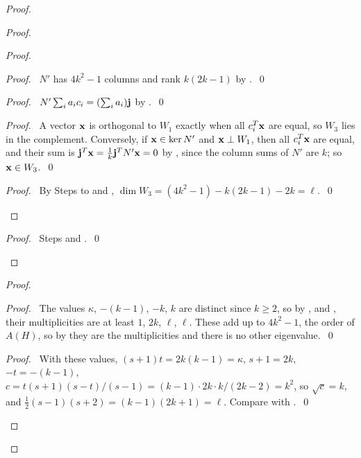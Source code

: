 \begin{proof}
\begin{proof}
  \begin{proof}
   \begin{proof}\pf\ $N'$ has $4k^2-1$ columns and rank $k(2k-1)$ by
    .~\qed\end{proof}
   \begin{proof}\pf\ $N'\sum_ia_ic_i=(\sum_ia_i){\mathbf j}$ by .~\qed\end{proof}
   \begin{proof}\pf\ A vector ${\mathbf x}$ is orthogonal to $W_1$ exactly when all $c_i^T{\mathbf x}$ are
    equal, so $W_3$ lies in the complement. Conversely, if ${\mathbf x}\in\ker N'$ and ${\mathbf x}\perp W_1$,
    then all $c_i^T{\mathbf x}$ are equal, and their sum is ${\mathbf j}^T{\mathbf x}=\frac1k{\mathbf j}^TN'{\mathbf x}=0$ by
    , since the column sums of $N'$ are $k$; so ${\mathbf x}\in
    W_3$.~\qed\end{proof}
   \qedstep
   \begin{proof}\pf\ By Steps  to  and ,
    $\dim W_3=(4k^2-1)-k(2k-1)-2k=\ell$.~\qed\end{proof}
  \end{proof}
  \qedstep
  \begin{proof}\pf\ Steps  and .~\qed\end{proof}
 \end{proof}
 \begin{proof}
  \begin{proof}\pf\ The values $\kappa$, $-(k-1)$, $-k$, $k$ are distinct since $k\ge2$, so by
   ,  and , their multiplicities are at
   least $1$, $2k$, $\ell$, $\ell$. These add up to $4k^2-1$, the order of $A(H)$, so by
    they are the multiplicities and there is no other eigenvalue.~\qed\end{proof}
  \begin{proof}\pf\ With these values, $(s+1)t=2k(k-1)=\kappa$, $s+1=2k$, $-t=-(k-1)$,
   $c=t(s+1)(s-t)/(s-1)=(k-1)\cdot2k\cdot k/(2k-2)=k^2$, so $\sqrt c=k$, and
   $\frac12(s-1)(s+2)=(k-1)(2k+1)=\ell$. Compare with .~\qed\end{proof}

\end{proof}
\end{proof}
